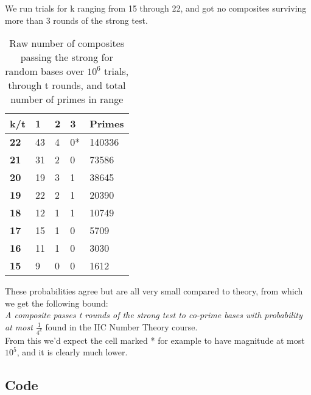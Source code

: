 \documentclass[10pt,a4paper]{report}
\begin{document}
We run trials for k ranging from 15 through 22, and got no composites surviving more than 3 rounds of the strong test.

\begin{table}[h]
\centering
\begin{tabular}{|l|l|l|l|l|}
\hline
\textbf{k/t} & \textbf{1} & \textbf{2} & \textbf{3} & \textbf{Primes} \\ \hline
\textbf{22}  & 43  & 4   & 0*   & 140336                    \\ \hline
\textbf{21}  & 31   & 2    & 0    & 73586                     \\ \hline
\textbf{20}  & 19   & 3    & 1    & 38645                     \\ \hline
\textbf{19}  & 22   & 2    & 1   & 20390                     \\ \hline
\textbf{18}  & 12   & 1  & 1    & 10749                     \\ \hline
\textbf{17}  & 15    & 1     & 0     & 5709                      \\ \hline
\textbf{16}  & 11    & 1     & 0     & 3030                      \\ \hline
\textbf{15}  & 9    & 0    & 0     & 1612                      \\ \hline
\end{tabular}
\caption{Raw number of composites passing the strong for random bases over $10^6$ trials, through t rounds, and total number of primes in range}
\end{table}

These probabilities agree but are all very small compared to theory, from which we get the following bound: \\

\textit{A composite passes t rounds of the strong test to co-prime bases with probability at most $\frac{1}{4^k}$} found in the IIC Number Theory course.\\

From this we'd expect the cell marked * for example to have magnitude at most $10^5$, and it is clearly much lower.

\newpage

\subsection*{Code}
\end{document}
